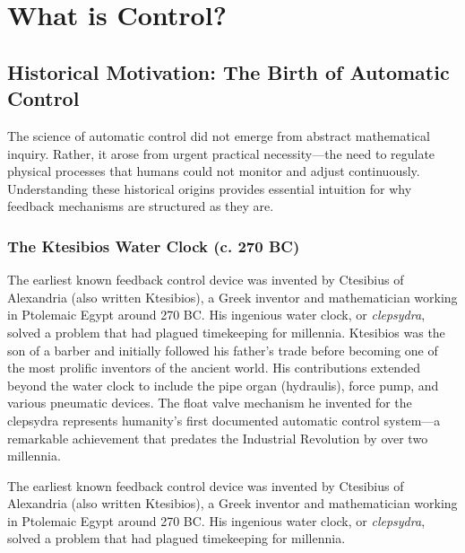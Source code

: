 
\chapter{What is Control?}
\label{ch:what_is_control}


\section{Historical Motivation: The Birth of Automatic Control}
\label{sec:history}

The science of automatic control did not emerge from abstract mathematical inquiry. Rather, it arose from urgent practical necessity---the need to regulate physical processes that humans could not monitor and adjust continuously. Understanding these historical origins provides essential intuition for why feedback mechanisms are structured as they are.

\subsection{The Ktesibios Water Clock (c. 270 BC)}
\label{subsec:ktesibios}

\begin{historicalbox}
The earliest known feedback control device was invented by Ctesibius of Alexandria (also written Ktesibios), a Greek inventor and mathematician working in Ptolemaic Egypt around 270 BC. His ingenious water clock, or \textit{clepsydra}, solved a problem that had plagued timekeeping for millennia. Ktesibios was the son of a barber and initially followed his father's trade before becoming one of the most prolific inventors of the ancient world. His contributions extended beyond the water clock to include the pipe organ (hydraulis), force pump, and various pneumatic devices. The float valve mechanism he invented for the clepsydra represents humanity's first documented automatic control system---a remarkable achievement that predates the Industrial Revolution by over two millennia.
\end{historicalbox}

The earliest known feedback control device was invented by Ctesibius of Alexandria (also written Ktesibios), a Greek inventor and mathematician working in Ptolemaic Egypt around 270 BC. His ingenious water clock, or \textit{clepsydra}, solved a problem that had plagued timekeeping for millennia.

